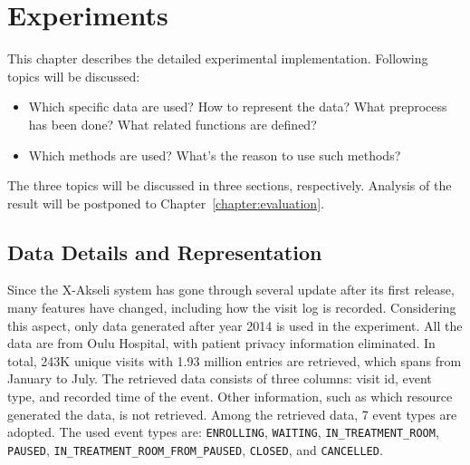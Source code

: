 \chapter{Experiments}
\label{chapter:Experiment}


	
This chapter describes the detailed experimental implementation. Following topics will be discussed:
\begin{itemize}
	\item	Which specific data are used? How to represent the data? What preprocess has been done? What related functions are defined?
	\item	Which methods are used? What's the reason to use such methods? 
\end{itemize}
The three topics will be discussed in three sections, respectively. Analysis of the result will be postponed to Chapter~\ref{chapter:evaluation}.

\section{Data Details and Representation}
Since the X-Akseli system has gone through several update after its first release, many features have changed, including how the visit log is recorded. Considering this aspect, only data generated after year 2014 is used in the experiment. All the data are from Oulu Hospital, with patient privacy information eliminated. In total, 243K unique visits with 1.93 million entries are retrieved, which spans from January to July. The retrieved data consists of three columns: visit id, event type, and recorded time of the event. Other information, such as which resource generated the data, is not retrieved. Among the retrieved data, 7 event types are adopted. The used event types are: \texttt{ENROLLING}, \texttt{WAITING}, \texttt{IN\_TREATMENT\_ROOM}, \texttt{PAUSED}, \texttt{IN\_TREATMENT\_ROOM\_FROM\_PAUSED}, \texttt{CLOSED}, and \texttt{CANCELLED}.

